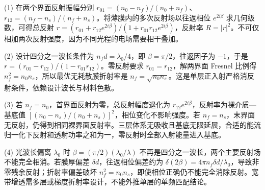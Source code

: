 (1) 在两个界面反射振幅分别 \(r_{01}=(n_0-n_f)/(n_0+n_f)\)、\(r_{12}=(n_f-n_s)/(n_f+n_s)\)。将薄膜内的多次反射场以往返相位 \(e^{2i\beta}\) 求几何级数，可得总反射 \(r=(r_{01}+r_{12}e^{2i\beta})/(1+r_{01}r_{12}e^{2i\beta})\)，反射率 \(R=|r|^2\)。不可仅相加两次反射强度，因为不同光程的电场需要相干叠加。

(2) 设计四分之一波长条件为 \(n_fd=\lambda_0/4\)，即 \(\beta=\pi/2\)，往返因子为 \(-1\)，于是 \(r=(r_{01}-r_{12})/(1-r_{01}r_{12})\)。零反射要求 \(r_{01}=r_{12}\)，解两界面 Fresnel 比例得 \(n_f^2=n_0n_s\)，所以最优无耗散膜折射率是 \(n_f=\sqrt{n_0n_s}\)。这是单层正入射严格消反射条件，依赖设计波长与材料色散。

(3) 若 \(n_f=n_0\)，首界面反射为零，总反射幅度退化为 \(r_{12}e^{2i\beta}\)，反射率为裸介质—基底值 \([(n_0-n_s)/(n_0+n_s)]^2\)，相位变化不影响强度。若 \(n_f=n_s\)，末界面无反射，仍得到相同裸界面反射率。三层体系无吸收且基底无限延展，合适的能流归一化下反射和透射功率之和为一，零反射时全部入射能量进入基底。

(4) 光波长偏离 \(\lambda_0\) 时 \(\beta=(\pi/2)(\lambda_0/\lambda)\) 不再是四分之一波长，两个主要反射场不能完全相消。若膜厚偏差 \(\delta d\)，往返相位偏差约为 \(\delta(2\beta)=4\pi n_f\delta d/\lambda_0\)，导致非零残余反射；折射率偏差破坏 \(n_f^2=n_0n_s\)，即使相位正确仍不能完全消除反射。宽带增透需多层或梯度折射率设计，不能外推单层的单频匹配结论。
